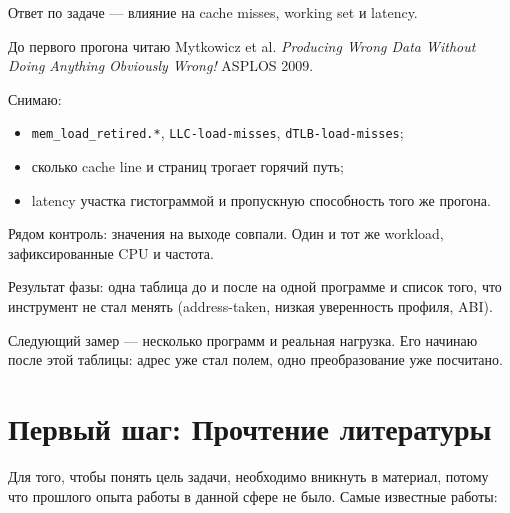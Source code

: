 \documentclass[a4paper,12pt]{article}
\begin{document}
\begin{ai}
Ответ по задаче --- влияние на cache misses, working set и latency.

До первого прогона читаю Mytkowicz et al. \textit{Producing Wrong
Data Without Doing Anything Obviously Wrong!} ASPLOS 2009.

Снимаю:

\begin{itemize}
    \item \texttt{mem\_load\_retired.*}, \texttt{LLC-load-misses},
    \texttt{dTLB-load-misses};
    \item сколько cache line и страниц трогает горячий путь;
    \item latency участка гистограммой и пропускную способность того
    же прогона.
\end{itemize}

Рядом контроль: значения на выходе совпали. Один и тот же workload,
зафиксированные CPU и частота.

Результат фазы: одна таблица до и после на одной программе и список
того, что инструмент не стал менять (address-taken, низкая
уверенность профиля, ABI).

Следующий замер --- несколько программ и реальная нагрузка. Его
начинаю после этой таблицы: адрес уже стал полем, одно
преобразование уже посчитано.
\end{ai}


\section{Первый шаг: Прочтение литературы}

Для того, чтобы понять цель задачи, необходимо вникнуть в материал, потому что
прошлого опыта работы в данной сфере не было. Самые известные работы:
\end{document}

